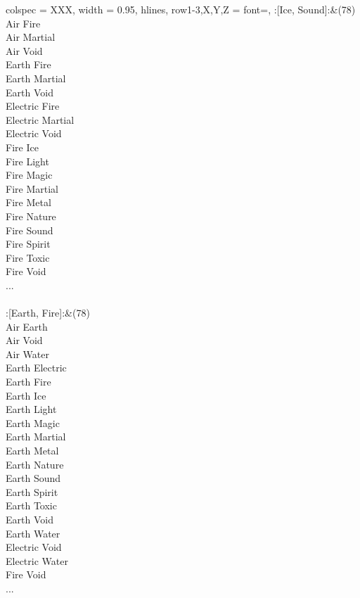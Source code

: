 \begin{longtblr}[
	caption = {2v2 Defending Weak},
	label = {2v2-Defending-Weak},
]{
	colspec = {XXX}, width = 0.95\linewidth,
	hlines,
	row{1-3,X,Y,Z} = {font=\bfseries},
}
	:[Ice, Sound]:&{(78)\\
	Air Fire \\
	Air Martial \\
	Air Void \\
	Earth Fire \\
	Earth Martial \\
	Earth Void \\
	Electric Fire \\
	Electric Martial \\
	Electric Void \\
	Fire Ice \\
	Fire Light \\
	Fire Magic \\
	Fire Martial \\
	Fire Metal \\
	Fire Nature \\
	Fire Sound \\
	Fire Spirit \\
	Fire Toxic \\
	Fire Void \\
	...\\
	}\\

	:[Earth, Fire]:&{(78)\\
	Air Earth \\
	Air Void \\
	Air Water \\
	Earth Electric \\
	Earth Fire \\
	Earth Ice \\
	Earth Light \\
	Earth Magic \\
	Earth Martial \\
	Earth Metal \\
	Earth Nature \\
	Earth Sound \\
	Earth Spirit \\
	Earth Toxic \\
	Earth Void \\
	Earth Water \\
	Electric Void \\
	Electric Water \\
	Fire Void \\
	...\\
	}\\


\end{longtblr}

